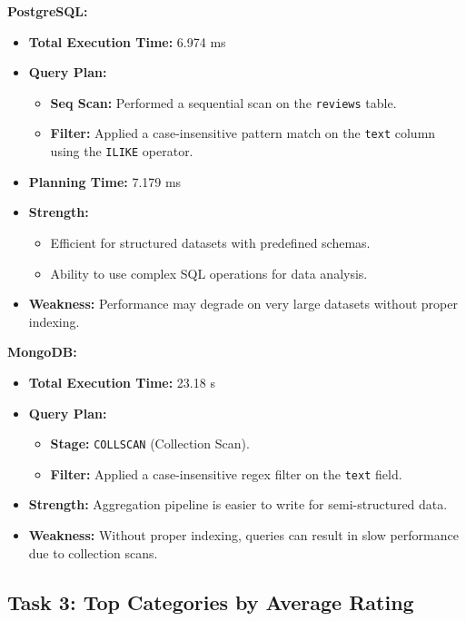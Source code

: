 \documentclass[12pt]{article}
\begin{document}
\textbf{PostgreSQL:}
\begin{itemize}
    \item \textbf{Total Execution Time:} 6.974 ms
    \item \textbf{Query Plan:}
        \begin{itemize}
            \item \textbf{Seq Scan:} Performed a sequential scan on the \texttt{reviews} table.
            \item \textbf{Filter:} Applied a case-insensitive pattern match on the \texttt{text} column using the \texttt{ILIKE} operator.
        \end{itemize}
    \item \textbf{Planning Time:} 7.179 ms
    \item \textbf{Strength:} 
        \begin{itemize}
            \item Efficient for structured datasets with predefined schemas.
            \item Ability to use complex SQL operations for data analysis.
        \end{itemize}
    \item \textbf{Weakness:} Performance may degrade on very large datasets without proper indexing.
\end{itemize}

\textbf{MongoDB:}
\begin{itemize}
    \item \textbf{Total Execution Time:} 23.18 s
    \item \textbf{Query Plan:}
        \begin{itemize}
            \item \textbf{Stage:} \texttt{COLLSCAN} (Collection Scan).
            \item \textbf{Filter:} Applied a case-insensitive regex filter on the \texttt{text} field.
        \end{itemize}
    \item \textbf{Strength:} Aggregation pipeline is easier to write for semi-structured data.
    \item \textbf{Weakness:} Without proper indexing, queries can result in slow performance due to collection scans.
\end{itemize}

\subsection*{Task 3: Top Categories by Average Rating}
\end{document}

